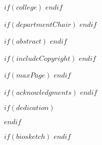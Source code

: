 $if(college)$
$endif$

$if(departmentChair)$
$endif$

$if(abstract)$
$endif$



$if(includeCopyright)$
$endif$

%
%
$if(maxPage)$
$endif$

$if(acknowledgments)$
$endif$

$if(dedication)$
\dedication{$dedication$}
$endif$


$if(biosketch)$
$endif$